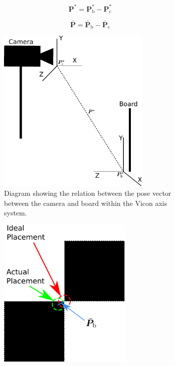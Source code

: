 \begin{equation}
 \label{eq:chap3-calibration-pose}
 \bm{P}^* = \bm{P}^*_\mathrm{b} - \bm{P}^*_\mathrm{c}
\end{equation}

\begin{equation}
  \label{eq:chap3-offset}
  \bar{\bm{P}} = \bar{\bm{P}}_\mathrm{b} - \bar{\bm{P}}_\mathrm{c}
\end{equation}

\begin{figure}
  \centering
    \begin{subfigure}[t]{0.48\textwidth}
    \includegraphics[width=0.8\textwidth]{figures/chapter3/P_star}
    \caption{Diagram showing the relation between the pose vector between the camera and board within the Vicon axis system.}
    \label{fig:chap3-p-star}
  \end{subfigure}
  \begin{subfigure}[t]{0.48\textwidth}
    \includegraphics[width=0.7\textwidth]{figures/chapter3/P_bar}

\end{subfigure}
\end{figure}
